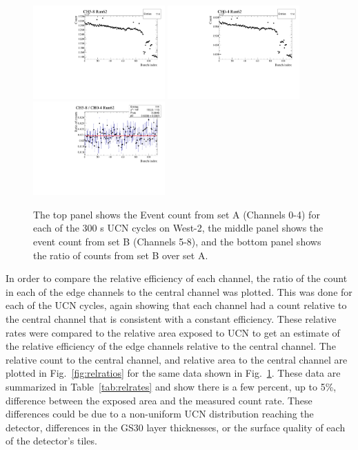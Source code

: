 \documentclass[twocolumn]{bmcart}
\begin{document}
\begin{figure}[!htpb]
\centering
\includegraphics[width=0.45\textwidth]{figures/ratestab_ch04_Run62.pdf}
\includegraphics[width=0.45\textwidth]{figures/ratestab_ch58_Run62.pdf}
\includegraphics[width=0.45\textwidth]{figures/ratestab_ratio_Run62.pdf}
\caption{ The top panel shows the Event count from set A (Channels
  0-4) for each of the 300 s UCN cycles on West-2, the middle panel
  shows the event count from set B (Channels 5-8), and the bottom
  panel shows the ratio of counts from set B over set A.}
\label{fig:ratiocount}
\end{figure}

In order to compare the relative efficiency of each channel, the ratio
of the count in each of the edge channels to the central channel was
plotted.  This was done for each of the UCN cycles, again showing that
each channel had a count relative to the central channel that is
consistent with a constant efficiency.  These relative rates were
compared to the relative area exposed to UCN to get an estimate of the
relative efficiency of the edge channels relative to the central
channel.  The relative count to the central channel, and relative area
to the central channel are plotted in Fig.~\ref{fig:relratios} for the
same data shown in Fig.~\ref{fig:ratiocount}.  These data are
summarized in Table~\ref{tab:relrates} and show there is a few
percent, up to 5\%, difference between the exposed area and the
measured count rate.  These differences could be due to a non-uniform
UCN distribution reaching the detector, differences in the GS30 layer
thicknesses, or the surface quality of each of the detector's tiles.
\end{document}
